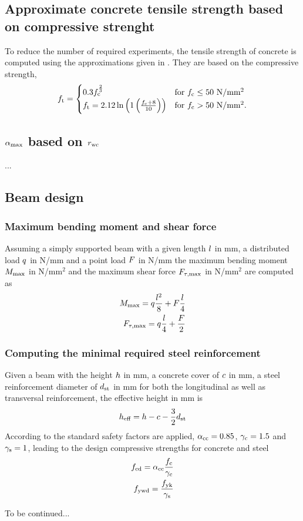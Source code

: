 \subsection{Approximate concrete tensile strength based on compressive strenght}
To reduce the number of required experiments, the tensile strength of concrete is computed using the approximations given in \citeauthor{DIN1992-1-1}.
They are based on the compressive strength, 
\begin{align}
f_{\text{t}} = 
\begin{cases}
0.3 f_{\text{c}}^{\frac{2}{3}}  & \text{for $f_{\text{c}} \le 50$ N/mm$^2$}\\
f_{\text{t}} =2.12 \ln \left( 1 \left( \frac{f_{\text{c}} + 8}{10}\right) \right)& \text{for $f_{\text{c}} > 50$ N/mm$^2$}  \label{eq:tensilstrength}.
\end{cases}
\end{align}
\subsection{$\alpha_{\text{max}}$ based on $r_{\text{wc}}$}
...
\subsection{Beam design}

\subsubsection{Maximum bending moment and shear force}
Assuming a simply supported beam with a given length $l$ in mm, a distributed load $q$ in N/mm and a point load $F$ in N/mm
the maximum bending moment $M_{\text{max}}$ in N/mm$^2$ and the maximum shear force $F_{\tau,\text{max}}$ in N/mm$^2$ are computed as
\begin{align}
	M_{\text{max}}= q \frac{l^2}{8} + F \frac{l}{4}\\
	F_{\tau,\text{max}} = q \frac{l}{4} + \frac{F}{2}
\end{align}
\subsubsection{Computing the minimal required steel reinforcement}
Given a beam with the height $h$ in mm, a concrete cover of $c$ in mm, a steel reinforcement diameter of $d_{\text{st}}$ in mm for both the longitudinal as well as transversal reinforcement, the effective height in mm is
\begin{align}
	h_{\text{eff}} = h - c - \frac{3}{2} d_{\text{st}}
\end{align}
According to the standard safety factors are applied, $\alpha_{\text{cc}} = 0.85$, $\gamma_{\text{c}} = 1.5$ and $\gamma_{\text{s}} = 1$, leading to the design compressive strengths for concrete and steel
\begin{align}
	f_{\text{cd}} = \alpha_{\text{cc}} \frac{f_{\text{c}} }{\gamma_{\text{c}}}\\
	f_{\text{ywd}} = \frac{f_{\text{yk}}}{\gamma_{\text{s}}}
\end{align}

To be continued...

